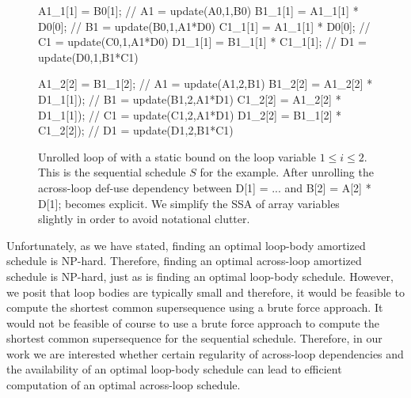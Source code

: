 \begin{figure}[h]
\centering
\begin{minipage}{0.7\textwidth}
\begin{javacode}
A1_1[1] = B0[1];              // A1 = update(A0,1,B0)
B1_1[1] = A1_1[1] * D0[0];    // B1 = update(B0,1,A1*D0)
C1_1[1] = A1_1[1] * D0[0];    // C1 = update(C0,1,A1*D0)
D1_1[1] = B1_1[1] * C1_1[1];  // D1 = update(D0,1,B1*C1)

A1_2[2] = B1_1[2];            // A1 = update(A1,2,B1)
B1_2[2] = A1_2[2] * D1_1[1]); // B1 = update(B1,2,A1*D1)
C1_2[2] = A1_2[2] * D1_1[1]); // C1 = update(C1,2,A1*D1)
D1_2[2] = B1_1[2] * C1_2[2]); // D1 = update(D1,2,B1*C1)
\end{javacode}
\end{minipage}
\caption{Unrolled loop of  with a static bound on the loop variable $1 \le i \le 2$. 
This is the sequential schedule $S$ for the example. After unrolling the across-loop def-use dependency 
between {\sf D[1] = ...} and {\sf B[2] = A[2] * D[1];} becomes explicit. We simplify the SSA of array variables 
slightly in order to avoid notational clutter.} 
\label{fig:flattenedloop}
\end{figure}

Unfortunately, as we have stated, finding an optimal loop-body amortized schedule is NP-hard. 
Therefore, finding an optimal across-loop amortized schedule is NP-hard, just as is finding an optimal loop-body schedule.
However, we posit that loop bodies are typically small and therefore, it would be feasible to compute the shortest common 
supersequence using a brute force approach. It would not be feasible of course to use a brute force approach to compute
the shortest common supersequence for the sequential schedule.
Therefore, in our work we are interested whether certain regularity of across-loop dependencies and the availability of
an optimal loop-body schedule can lead to efficient computation of an optimal across-loop schedule.

